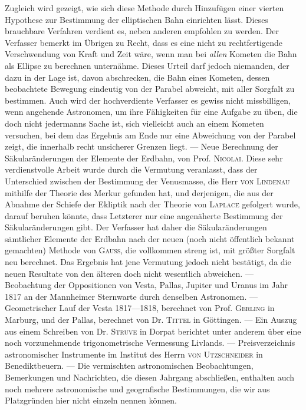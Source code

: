 Zugleich wird gezeigt, wie sich diese Methode durch Hinzufügen einer vierten Hypothese zur Bestimmung der elliptischen Bahn einrichten lässt. Dieses brauchbare Verfahren verdient es, neben anderen empfohlen zu werden. Der Verfasser bemerkt im Übrigen zu Recht, dass es eine nicht zu rechtfertigende Verschwendung von Kraft und Zeit wäre, wenn man bei \emph{allen} Kometen die Bahn als Ellipse zu berechnen unternähme. Dieses Urteil darf jedoch niemanden, der dazu in der Lage ist, davon abschrecken, die Bahn eines Kometen, dessen beobachtete Bewegung eindeutig von der Parabel abweicht, mit aller Sorgfalt zu bestimmen. Auch wird der hochverdiente Verfasser es gewiss nicht missbilligen, wenn angehende Astronomen, um ihre Fähigkeiten für eine Aufgabe zu üben, die doch nicht jedermanns Sache ist, sich vielleicht auch an einem Kometen versuchen, bei dem das Ergebnis am Ende nur eine Abweichung von der Parabel zeigt, die innerhalb recht unsicherer Grenzen liegt. --- Neue Berechnung der Säkularänderungen der Elemente der Erdbahn, von Prof. \textsc{Nicolai}. Diese sehr verdienstvolle Arbeit wurde durch die Vermutung veranlasst, dass der Unterschied zwischen der Bestimmung der Venusmasse, die Herr \textsc{von Lindenau} mithilfe der Theorie des Merkur gefunden hat, und derjenigen, die aus der Abnahme der Schiefe der Ekliptik nach der Theorie von \textsc{Laplace} gefolgert wurde, darauf beruhen könnte, dass Letzterer nur eine angenäherte Bestimmung der Säkularänderungen gibt. Der Verfasser hat daher die Säkularänderungen sämtlicher Elemente der Erdbahn nach der neuen (noch nicht öffentlich bekannt gemachten) Methode von \textsc{Gauss}, die vollkommen streng ist, mit größter Sorgfalt neu berechnet. Das Ergebnis hat jene Vermutung jedoch nicht bestätigt, da die neuen Resultate von den älteren doch nicht wesentlich abweichen. --- Beobachtung der Oppositionen von Vesta, Pallas, Jupiter und Uranus im Jahr 1817 an der Mannheimer Sternwarte durch denselben Astronomen. --- Geometrischer Lauf der Vesta 1817---1818, berechnet von Prof. \textsc{Gerling} in Marburg, und der Pallas, berechnet von Dr. \textsc{Tittel} in Göttingen. --- Ein Auszug aus einem Schreiben von Dr. \textsc{Struve} in Dorpat berichtet unter anderem über eine noch vorzunehmende trigonometrische Vermessung Livlands. --- Preisverzeichnis astronomischer Instrumente im Institut des Herrn \textsc{von Utzschneider} in Benediktbeuern. --- Die vermischten astronomischen Beobachtungen, Bemerkungen und Nachrichten, die diesen Jahrgang abschließen, enthalten auch noch mehrere astronomische und geografische Bestimmungen, die wir aus Platzgründen hier nicht einzeln nennen können.
\par\clearpage\endgroup
